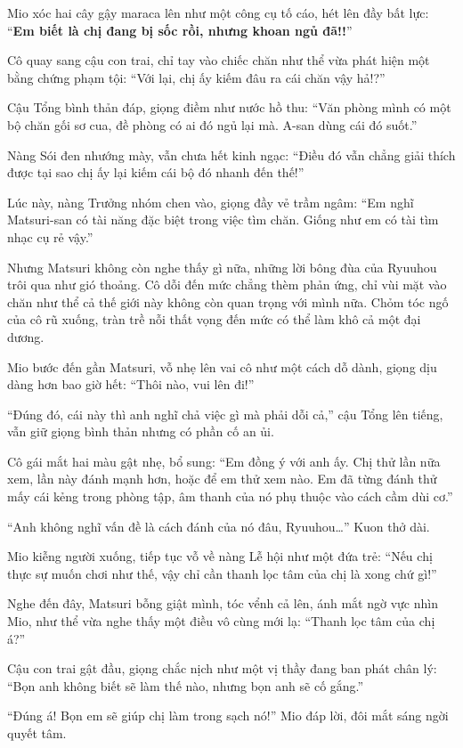 \documentclass[../main.tex]{subfiles}
\begin{document}
Mio xóc hai cây gậy maraca lên như một công cụ tố cáo, hét lên đầy bất lực: ``\textbf{Em biết là chị đang bị sốc rồi, nhưng khoan ngủ đã!!}''

Cô quay sang cậu con trai, chỉ tay vào chiếc chăn như thể vừa phát hiện một bằng chứng phạm tội: ``Với lại, chị ấy kiếm đâu ra cái chăn vậy hả!?''

Cậu Tổng bình thản đáp, giọng điềm như nước hồ thu: ``Văn phòng mình có một bộ chăn gối sơ cua, đề phòng có ai đó ngủ lại mà. A-san dùng cái đó suốt.''

Nàng Sói đen nhướng mày, vẫn chưa hết kinh ngạc: ``Điều đó vẫn chẳng giải thích được tại sao chị ấy lại kiếm cái bộ đó nhanh đến thế!''

Lúc này, nàng Trưởng nhóm chen vào, giọng đầy vẻ trầm ngâm: ``Em nghĩ Matsuri-san có tài năng đặc biệt trong việc tìm chăn. Giống như em có tài tìm nhạc cụ rẻ vậy.''

Nhưng Matsuri không còn nghe thấy gì nữa, những lời bông đùa của Ryuuhou trôi qua như gió thoảng. Cô dỗi đến mức chẳng thèm phản ứng, chỉ vùi mặt vào chăn như thể cả thế giới này không còn quan trọng với mình nữa. Chỏm tóc ngố của cô rũ xuống, tràn trề nỗi thất vọng đến mức có thể làm khô cả một đại dương.

Mio bước đến gần Matsuri, vỗ nhẹ lên vai cô như một cách dỗ dành, giọng dịu dàng hơn bao giờ hết: ``Thôi nào, vui lên đi!''

``Đúng đó, cái này thì anh nghĩ chả việc gì mà phải dỗi cả,'' cậu Tổng lên tiếng, vẫn giữ giọng bình thản nhưng có phần cố an ủi.

Cô gái mắt hai màu gật nhẹ, bổ sung: ``Em đồng ý với anh ấy. Chị thử lần nữa xem, lần này đánh mạnh hơn, hoặc để em thử xem nào. Em đã từng đánh thử mấy cái kẻng trong phòng tập, âm thanh của nó phụ thuộc vào cách cầm dùi cơ.''

``Anh không nghĩ vấn đề là cách đánh của nó đâu, Ryuuhou\dots'' Kuon thở dài.

Mio kiễng người xuống, tiếp tục vỗ về nàng Lễ hội như một đứa trẻ: ``Nếu chị thực sự muốn chơi như thế, vậy chỉ cần thanh lọc tâm của chị là xong chứ gì!''

Nghe đến đây, Matsuri bỗng giật mình, tóc vểnh cả lên, ánh mắt ngờ vực nhìn Mio, như thể vừa nghe thấy một điều vô cùng mới lạ: ``Thanh lọc tâm của chị á?''

Cậu con trai gật đầu, giọng chắc nịch như một vị thầy đang ban phát chân lý: ``Bọn anh không biết sẽ làm thế nào, nhưng bọn anh sẽ cố gắng.''

``Đúng á! Bọn em sẽ giúp chị làm trong sạch nó!'' Mio đáp lời, đôi mắt sáng ngời quyết tâm.
\end{document}
